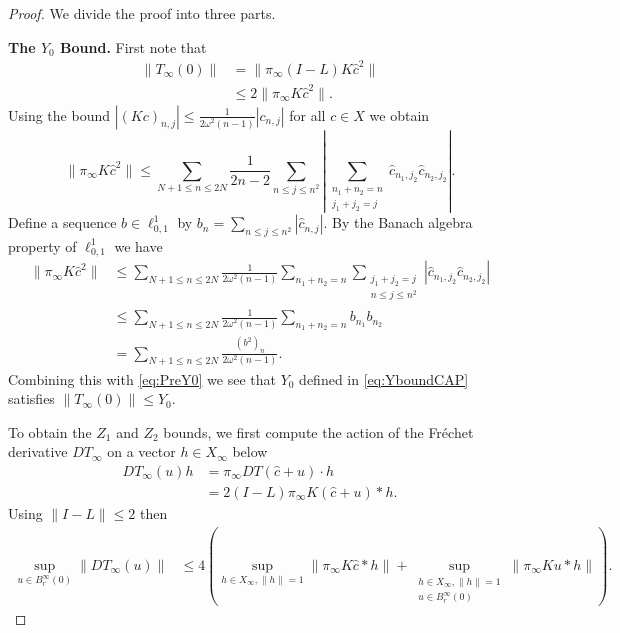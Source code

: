 \documentclass{article}
\newcommand{\cTrunc}{\hat{c}}
\begin{document}
\begin{proof}
	

We divide the proof into three parts. 

\textbf{The $Y_0$ Bound.} 
First note that 
	\begin{align}
		\| T_\infty(0) \| &= \| \pi_\infty  (I- L) K \hat{c}^2 \|  \nonumber \\
		&\leq 2 \| \pi_\infty K \hat{c}^2 \| . \label{eq:PreY0}
	\end{align}
	 Using the bound $ | (Kc)_{n,j} | \leq \frac{1}{2\omega^2(n-1)} | c_{n,j}|$ for all $ c \in X$ we obtain 
	 \[
\|	 \pi_{\infty} K \hat{c}^2 \| \leq 
\sum_{N+1 \leq n \leq 2 N } \frac{1}{2n-2} \sum_{n \leq j \leq n^2}
 \left|
\sum_{\substack{n_1 + n_2 = n \\j_1 +j_2 = j}}\hat{c}_{n_1,j_2} \hat{c}_{n_2,j_2} 
\right| .
	 \]
	 Define a sequence $ b \in \ell^1_{0,1} $ by $ b_{n} = \sum_{n \leq j \leq n^2} |\hat{c}_{n,j}| $. 
	 By the Banach algebra property of $\ell^1_{0,1}$ we have 
	 \begin{align*}
\|	 \pi_{\infty} K \hat{c}^2\| &\leq 
\sum_{N+1 \leq n \leq 2 N } \frac{1}{2\omega^2(n-1)} \sum_{n_1 + n_2 = n }
\sum_{\substack{j_1 +j_2 = j \\n \leq j \leq n^2}}
\left| \hat{c}_{n_1,j_2} \hat{c}_{n_2,j_2} 
\right| \\
&\leq 
\sum_{N+1 \leq n \leq 2 N } \frac{1}{2\omega^2(n-1)} \sum_{n_1 + n_2 = n } b_{n_1} b_{n_2} \\
& = 
\sum_{N+1 \leq n \leq 2 N } \frac{(b^2)_n}{2\omega^2(n-1)} .
	 \end{align*}
	 Combining this with \eqref{eq:PreY0} we see that $Y_0$ defined in \eqref{eq:YboundCAP} satisfies  $ \| T_\infty(0) \| \leq Y_0$. 
	 \newline 
	 
	 
	To obtain the $Z_1$ and $Z_2$  bounds,  we first compute the action of the  Fr\'echet derivative $DT_\infty$  on a vector $ h \in X_\infty$ below
\begin{align*}
	DT_\infty(u)h 
	&= 
	\pi_{\infty } DT(\cTrunc+u) \cdot h \\
	&= 2  (I-L)  \pi_{\infty }  K (\cTrunc + u) * h .
\end{align*}
Using $ \| I - L \| \leq 2$ then  
\begin{align}\label{eq:ZboundStart}
	\sup_{u \in B^\infty_r(0)} 
\|		DT_\infty(u) \| 	&\leq 
4 
\left(
\sup_{ h \in X_\infty, \|h\|=1} 
\| \pi_{\infty }  K \cTrunc *h  \|
+ 
\sup_{\substack{ h \in X_\infty, \|h\|=1 \\ u \in B^\infty_r(0) }}
\| \pi_{\infty }  K u *h \|
\right) .
\end{align}



\end{proof}
\end{document}
